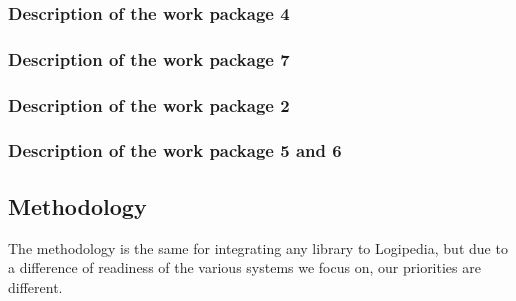 \subsubsection{Description of the work package 4}

\subsubsection{Description of the work package 7}

\subsubsection{Description of the work package 2}

\subsubsection{Description of the work package 5 and 6}

\subsection{Methodology}

The methodology is the same for integrating any library to {\sc Logipedia},
but due to a difference of readiness of the various systems we focus on,
our priorities are different.

